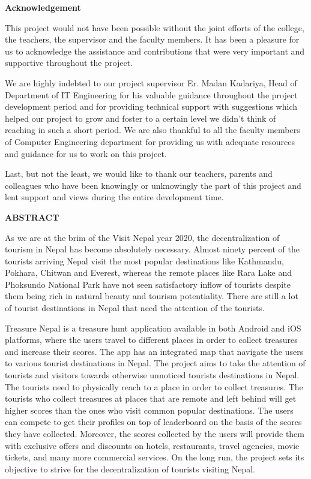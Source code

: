 \documentclass[12pt, a4paper, oneside]{article}
\begin{document}
\large
\begin{center}
	\textbf{Acknowledgement}
\end{center}

\normalsize

This project would not have been possible without the joint efforts of the college, the teachers, the supervisor and the faculty members. It has been a pleasure for us to acknowledge the assistance and contributions that were very important and supportive throughout the project.

We are highly indebted to our project supervisor Er. Madan Kadariya, Head of Department of IT Engineering for his valuable guidance throughout the project development period and for providing technical support with suggestions which helped our project to grow and foster to a certain level we didn’t think of reaching in such a short period. We are also thankful to all the faculty members of Computer Engineering department for providing us with adequate resources and guidance for us to work on this project.

Last, but not the least, we would like to thank our teachers, parents and colleagues who have been knowingly or unknowingly the part of this project and lent support and views during the entire development time.

\break





\large
\begin{center}
	\textbf{ABSTRACT}
\end{center}
\normalsize
As we are at the brim of the Visit Nepal year 2020, the decentralization of tourism in Nepal has become absolutely necessary. Almost ninety percent of the tourists arriving Nepal visit the most popular destinations like Kathmandu, Pokhara, Chitwan and Everest, whereas the remote places like Rara Lake and Phoksundo National Park have not seen satisfactory inflow of tourists despite them being rich in natural beauty and tourism potentiality. There are still a lot of tourist destinations in Nepal that need the attention of the tourists.

Treasure Nepal is a treasure hunt application available in both Android and iOS platforms, where the users travel to different places in order to collect treasures and increase their scores. The app has an integrated map that navigate the users to various tourist destinations in Nepal. The project aims to take the attention of tourists and visitors towards otherwise unnoticed tourists destinations in Nepal. The tourists need to physically reach to a place in order to collect treasures. The tourists who collect treasures at places that are remote and left behind will get higher scores than the ones who visit common popular destinations. The users can compete to get their profiles on top of leaderboard on the basis of the scores they have collected. Moreover, the scores collected by the users will provide them with exclusive offers and discounts on hotels, restaurants, travel agencies, movie tickets, and many more commercial services. On the long run, the project sets its objective to strive for the decentralization of tourists visiting Nepal.
\end{document}

